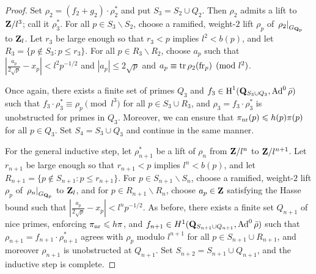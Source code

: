 \begin{proof}
Set $\rho_2 = (f_2+g_2)\cdot\rho_2^\ast$ and put $S_3 = S_2\cup Q_2$. Then 
$\rho_2$ admits a lift to $\mathbf{Z}/l^3$; call it $\rho_3^\ast$. For all 
$p\in S_3\smallsetminus S_2$, choose a ramified, weight-$2$ lift $\rho_p$ of 
$\left.\rho_2\right|_{G_{\mathbf{Q}_p}}$ to $\mathbf{Z}_l$. Let $r_3$ be large enough so that 
$r_3 < p$ implies $l^2 < b(p)$, and let 
$R_3 = \{p\notin S_3 : p\leqslant r_3\}$. For all $p\in R_3\smallsetminus R_2$, 
choose $a_p$ such that $\left|\frac{a_p}{2\sqrt p} - x_p\right| < l^2 p^{-1/2}$ 
and $|a_p| \leqslant 2\sqrt p$ and $a_p \equiv \operatorname{tr}\rho_2(\mathrm{fr}_p)\pmod{l^2}$. 

Once again, there exists a finite set of primes $Q_3$ and 
$f_3\in \operatorname{H}^1(\mathbf{Q}_{S_3\cup Q_3},\operatorname{Ad}^0\bar\rho)$ such that 
$f_3\cdot\rho_3^\ast\equiv \rho_p\pmod{l^3}$ for all $p\in S_3\cup R_3$, and 
$\rho_3 = f_3\cdot\rho_3^\ast$ is unobstructed for primes in $Q_3$. Moreover, 
we can ensure that $\pi_{\mathrm{nr}}(p) \leqslant h(p) \pi(p)$ for all $p\in Q_3$. Set 
$S_4 = S_3\cup Q_3$ and continue in the same manner. 

For the general inductive step, let $\rho_{n+1}^\ast$ be a lift of $\rho_n$ 
from $\mathbf{Z}/l^n$ to $\mathbf{Z}/l^{n+1}$. Let $r_{n+1}$ be large enough so that 
$r_{n+1} < p$ implies $l^n < b(p)$, and let 
$R_{n+1} = \{p\notin S_{n+1} : p\leqslant r_{n+1}\}$. For 
$p\in S_{n+1}\smallsetminus S_n$, choose a ramified, weight-$2$ lift $\rho_p$ 
of $\left.\rho_n\right|_{G_{\mathbf{Q}_p}}$ to $\mathbf{Z}_l$, and for 
$p\in R_{n+1}\smallsetminus R_n$, choose $a_p\in \mathbf{Z}$ satisfying the Hasse 
bound such that $\left|\frac{a_p}{2\sqrt p} - x_p\right| < l^n p^{-1/2}$. As 
before, there exists a finite set $Q_{n+1}$ of nice primes, enforcing 
$\pi_{\mathrm{nr}} \leqslant h \pi$, and 
$f_{n+1}\in H^1(\mathbf{Q}_{S_{n+1}\cup Q_{n+1}},\operatorname{Ad}^0\bar\rho)$ such that 
$\rho_{n+1} = f_{n+1}\cdot\rho_{n+1}^\ast$ agrees with $\rho_p$ modulo 
$l^{n+1}$ for all $p\in S_{n+1}\cup R_{n+1}$, and moreover $\rho_{n+1}$ is 
unobstructed at $Q_{n+1}$. Set $S_{n+2} = S_{n+1} \cup Q_{n+1}$, and the 
inductive step is complete. 
\end{proof}






